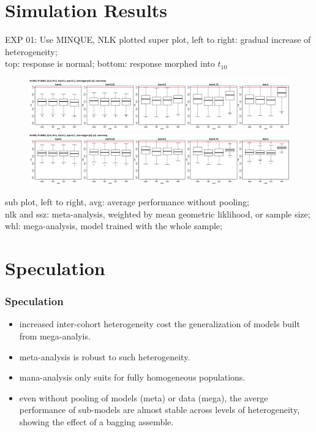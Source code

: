 \documentclass{beamer}
\begin{document}
\section{Simulation Results}
\begin{frame}{EXP 01: Use MINQUE, NLK plotted}
  \scriptsize super plot, left to right: gradual increase of heterogeneity;\\
  top: response is normal; bottom: response morphed into $t_{10}$ \\
  \normalsize
  \begin{figure}
    \includegraphics[width=\linewidth]{km2_mnq_s01.png} \\
    \includegraphics[width=\linewidth]{km2_mnq_s02.png}
  \end{figure}
  \tiny sub plot, left to right, avg: average performance without pooling;\\
  nlk and ssz: meta-analysis, weighted by mean geometric liklihood, or sample size; \\
  whl: mega-analysis, model trained with the whole sample;
\end{frame}
\section{Speculation}
\begin{frame}
  \frametitle{Speculation}
  \begin{itemize}
  \item increased inter-cohort heterogeneity cost the generalization
    of models built from mega-analyis.
  \item meta-analysis is robust to such heterogeneity.
  \item mana-analysis only suits for fully homogeneous populations.
  \item even without pooling of models (meta) or data (mega), the
    averge performance of sub-models are almost stable across levels
    of heterogeneity, showing the effect of a bagging assemble.
  \end{itemize}
\end{frame}
\end{document}
